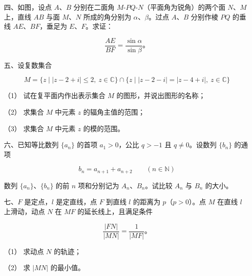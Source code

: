 \begin{question}

四、如图，设点 $A\text{、}B$ 分别在二面角 $M$-$PQ$-$N$（平面角为锐角）的两个面 $N\text{、}M$ 上，直线 $AB$ 与面 $M\text{、}N$ 所成的角分别为 $\alpha\text{、}\beta$。过点 $A\text{、}B$ 分别作棱 $PQ$ 的垂线 $AE\text{、}BF$，垂足为 $E\text{、}F$。求证：

\nopagebreak[4]
\[
\frac{AE}{BF}=\frac{\sin\alpha}{\sin\beta}\text{。}
\]
\nopagebreak[4]
\begin{center}\end{center}
\nopagebreak[4]
\end{question}
\begin{question}

五、设复数集合

\nopagebreak[4]
\[
M=\{z\mid |z-2+i|\le2,\ z\in\mathbb C\}\cap\{z\mid |z-2-i|=|z-4+i|,\ z\in\mathbb C\}
\]

（1） 试在复平面内作出表示集合 $M$ 的图形，并说出图形的名称；

（2） 求集合 $M$ 中元素 $z$ 的辐角主值的范围；

（3） 求集合 $M$ 中元素 $z$ 的模的范围。

\end{question}
\begin{question}

六、已知等比数列 $\{a_n\}$ 的首项 $a_1>0$，公比 $q>-1$ 且 $q\ne0$。设数列 $\{b_n\}$ 的通项

\nopagebreak[4]
\[
b_n=a_{n+1}+a_{n+2}\qquad(n\in\mathbb N)
\]

数列 $\{a_n\}$、$\{b_n\}$ 的前 $n$ 项和分别记为 $A_n\text{、}B_n$。试比较 $A_n$ 与 $B_n$ 的大小。

\end{question}
\begin{question}

七、$F$ 是定点，$l$ 是定直线，点 $F$ 到直线 $l$ 的距离为 $p$（$p>0$）。点 $M$ 在直线 $l$ 上滑动，动点 $N$ 在 $MF$ 的延长线上，且满足条件

\nopagebreak[4]
\[
\frac{|FN|}{|MN|}=\frac1{|MF|}\text{。}
\]

（1） 求动点 $N$ 的轨迹；

（2） 求 $|MN|$ 的最小值。

\end{question}